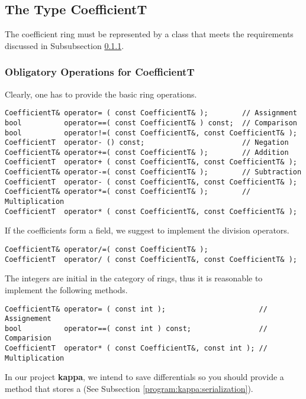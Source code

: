 \subsection{The Type CoefficientT}
\label{program:libhomology:CoefficientT}

The coefficient ring must be represented by a class that meets the requirements discussed in Subsubsection \ref{program:libhomology:CoefficientT:obligatory_reqs}.

\subsubsection{Obligatory Operations for CoefficientT}
\label{program:libhomology:CoefficientT:obligatory_reqs}
Clearly, one has to provide the basic ring operations.
\begin{lstlisting}
CoefficientT& operator= ( const CoefficientT& );        // Assignment
bool          operator==( const CoefficientT& ) const;  // Comparison
bool          operator!=( const CoefficientT&, const CoefficientT& );
CoefficientT  operator- () const;                       // Negation
CoefficientT& operator+=( const CoefficientT& );        // Addition
CoefficientT  operator+ ( const CoefficientT&, const CoefficientT& );
CoefficientT& operator-=( const CoefficientT& );        // Subtraction
CoefficientT  operator- ( const CoefficientT&, const CoefficientT& );
CoefficientT& operator*=( const CoefficientT& );        // Multiplication
CoefficientT  operator* ( const CoefficientT&, const CoefficientT& );
\end{lstlisting}
If the coefficients form a field, we suggest to implement the division operators.
\begin{lstlisting}
CoefficientT& operator/=( const CoefficientT& );
CoefficientT  operator/ ( const CoefficientT&, const CoefficientT& );
\end{lstlisting}

The integers are initial in the category of rings, thus it is reasonable to implement the following methods.
\begin{lstlisting}
CoefficientT& operator= ( const int );                      // Assignement
bool          operator==( const int ) const;                // Comparision
CoefficientT  operator* ( const CoefficientT&, const int ); // Multiplication
\end{lstlisting}

In our project {\bf kappa}, we intend to save differentials so you should provide a method that stores a  (See Subsection \ref{program:kappa:serialization}).

